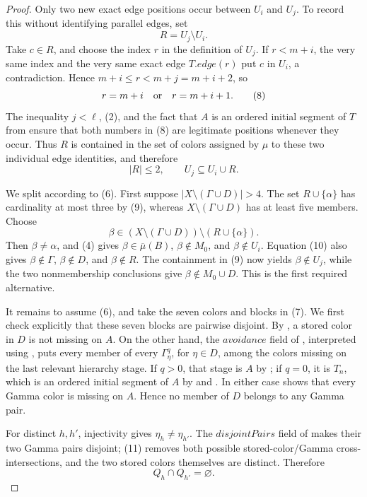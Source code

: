 \begin{proof}
Only two new exact edge positions occur between \(U_i\) and \(U_j\).  To
record this without identifying parallel edges, set
\[
                              R=U_j\setminus U_i.
\]
Take \(c\in R\), and choose the index \(r\) in the definition of \(U_j\).
If \(r<m+i\), the very same index and the very same exact edge
\(T.\mathit{edge}(r)\) put \(c\) in \(U_i\), a contradiction.  Hence
\(m+i\le r<m+j=m+i+2\), so
\[
                         r=m+i\quad\hbox{or}\quad r=m+i+1.     \tag{8}
\]
The inequality \(j<\ell\), (2), and the fact that \(A\) is an ordered
initial segment of \(T\) from  ensure that
both numbers in (8) are legitimate positions whenever they occur.
Thus \(R\) is contained in the set of colors assigned by \(\mu\) to these
two individual edge identities, and therefore
\[
                              |R|\le2,\qquad U_j\subseteq U_i\cup R. \tag{9}
\]

We split according to (6).  First suppose
\(|X\setminus(\Gamma\cup D)|>4\).  The set
\(R\cup\{\alpha\}\) has cardinality at most three by (9), whereas
\(X\setminus(\Gamma\cup D)\) has at least five members.  Choose
\[
 \beta\in (X\setminus(\Gamma\cup D))\setminus(R\cup\{\alpha\}). \tag{10}
\]
Then \(\beta\ne\alpha\), and (4) gives
\(\beta\in\overline\mu(B)\), \(\beta\notin M_0\), and
\(\beta\notin U_i\).  Equation (10) also gives
\(\beta\notin\Gamma\), \(\beta\notin D\), and \(\beta\notin R\).
The containment in (9) now yields \(\beta\notin U_j\), while the two
nonmembership conclusions give \(\beta\notin M_0\cup D\).  This is the
first required alternative.

It remains to assume (6), and take the seven colors and blocks in (7).
We first check explicitly that these seven blocks are pairwise disjoint.
By , a stored color in \(D\) is not
missing on \(A\).  On the other hand, the \(\mathit{avoidance}\) field of
, interpreted using
, puts every member of every
\(\Gamma^q_\eta\), for \(\eta\in D\), among the colors missing on the
last relevant hierarchy stage.  If \(q>0\), that stage is \(A\) by
; if \(q=0\), it is \(T_n\), which is an
ordered initial segment of \(A\) by  and
.  In either case
 shows that every Gamma color is missing on
\(A\).  Hence no member of \(D\) belongs to any Gamma pair.             

For distinct \(h,h'\), injectivity gives
\(\eta_h\ne\eta_{h'}\).  The \(\mathit{disjointPairs}\) field of
 makes their two Gamma pairs disjoint; (11) removes
both possible stored-color/Gamma cross-intersections, and the two stored
colors themselves are distinct.  Therefore
\[
                              Q_h\cap Q_{h'}=\varnothing.       \tag{12}
\]


\end{proof}
